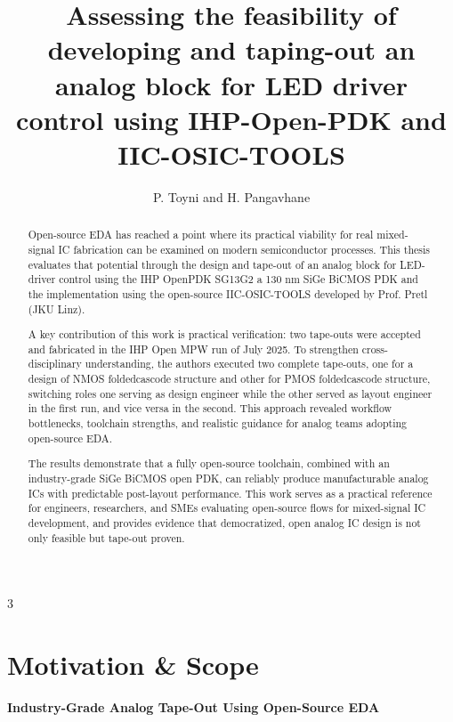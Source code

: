 \documentclass[a0,portrait,ruledsections]{sciposter}
\title{Assessing the feasibility of developing and taping-out an analog block for LED driver control using IHP-Open-PDK
  and IIC-OSIC-TOOLS}
\author{P. Toyni and H. Pangavhane}
\institute{Prof. Dr.-Ing. M. Meiners, Concept Engineering SOCs and Design}
\begin{document}
\maketitle

% 
\begin{multicols}{3}
%
\begin{abstract}
Open-source EDA has reached a point where its practical viability for real mixed-signal IC fabrication can be examined on modern semiconductor processes. This thesis evaluates that potential through the design and tape-out of an analog block for LED-driver control using the IHP OpenPDK SG13G2 a 130 nm SiGe BiCMOS PDK and the implementation using the open-source IIC-OSIC-TOOLS developed by Prof. Pretl (JKU Linz).

A key contribution of this work is practical verification: two tape-outs were accepted and fabricated in the IHP Open MPW run of July 2025. To strengthen cross-disciplinary understanding, the authors executed two complete tape-outs, one for a design of NMOS foldedcascode structure and other for PMOS foldedcascode structure, switching roles one serving as design engineer while the other served as layout engineer in the first run, and vice versa in the second. This approach revealed workflow bottlenecks, toolchain strengths, and realistic guidance for analog teams adopting open-source EDA.

The results demonstrate that a fully open-source toolchain, combined with an industry-grade SiGe BiCMOS open PDK, can reliably produce manufacturable analog ICs with predictable post-layout performance. This work serves as a practical reference for engineers, researchers, and SMEs evaluating open-source flows for mixed-signal IC development, and provides evidence that democratized, open analog IC design is not only feasible but tape-out proven.
\end{abstract}
%



\section{Motivation \& Scope}\label{sec:ubersicht}

\textbf{Industry-Grade Analog Tape-Out Using Open-Source EDA}


\end{multicols}
\end{document}
